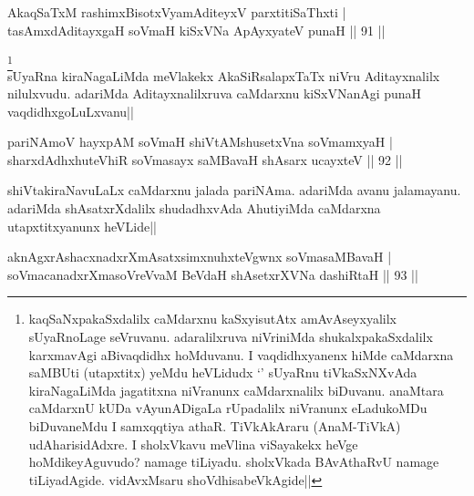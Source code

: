 
\begin{shl}
AkaqSaTxM rashimxBisotxVyamAditeyxV parxtitiSaThxti | \\
tasAmxdAditayxgaH soVmaH kiSxVNa ApAyxyateV punaH \hfill|| 91 || 
\end{shl}

\begin{artha}
\footnote[1]{kaqSaNxpakaSxdalilx caMdarxnu kaSxyisutAtx 
amAvAseyxyalilx sUyaRnoLage seVruvanu. adaralilxruva niVriniMda 
shukalxpakaSxdalilx karxmavAgi aBivaqdidhx hoMduvanu. I vaqdidhxyanenx 
hiMde caMdarxna saMBUti (utapxtitx) yeMdu heVLidudx `\stext' sUyaRnu 
tiVkaSxNXvAda kiraNagaLiMda jagatitxna niVranunx caMdarxnalilx 
biDuvanu. anaMtara caMdarxnU kUDa vAyunADigaLa rUpadalilx niVranunx 
eLadukoMDu biDuvaneMdu I samxqqtiya athaR. TiVkAkAraru (AnaM-TiVkA) 
udAharisidAdxre. I sholxVkavu meVlina viSayakekx heVge 
hoMdikeyAguvudo? namage tiLiyadu. sholxVkada BAvAthaRvU namage 
tiLiyadAgide. vidAvxMsaru shoVdhisabeVkAgide||}\\
sUyaRna kiraNagaLiMda meVlakekx AkaSiRsalapxTaTx niVru Aditayxnalilx 
nilulxvudu. adariMda Aditayxnalilxruva caMdarxnu kiSxVNanAgi punaH 
vaqdidhxgoLuLxvanu||
\end{artha}


\begin{shl}
pariNAmoV hayxpAM soVmaH shiVtAMshusetxVna soV\s mamxyaH | \\
sharxdAdhxhuteVhiR soVmasayx saMBavaH shAsarx ucayxteV \hfill|| 92 || 
\end{shl}

\begin{artha}
shiVtakiraNavuLaLx caMdarxnu jalada pariNAma. adariMda avanu 
jalamayanu. adariMda shAsatxrXdalilx shudadhxvAda AhutiyiMda caMdarxna 
utapxtitxyanunx heVLide||
\end{artha}


\begin{shl}
aknAgxrAshacxnadxrXmAsatxsimxnuhxteV\s gwnx soVmasaMBavaH | \\
soVmacanadxrXmasoVreVvaM BeVdaH shAsetxrXVNa dashiRtaH \hfill|| 93 || 
\end{shl}

